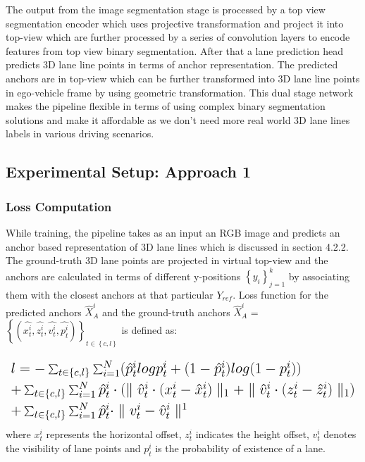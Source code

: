          The output from the image segmentation stage is processed by a top view segmentation encoder which uses projective transformation and project it into top-view which are further processed by a series of convolution layers to encode features from top view binary segmentation. After that a lane prediction head predicts 3D lane line points in terms of anchor representation. The predicted anchors are in top-view which can be further transformed into 3D lane line points in ego-vehicle frame by using geometric transformation. This dual stage network makes the pipeline flexible in terms of using complex binary segmentation solutions and make it affordable as we don't need more real world 3D lane lines labels in various driving scenarios.
        
        
        \subsection{Experimental Setup: Approach 1}
        
        
            \subsubsection{Loss Computation}
            While training, the pipeline takes as an input an RGB image and predicts an anchor based representation of 3D lane lines which is discussed in section 4.2.2. The ground-truth 3D lane points are projected in virtual top-view and the anchors are calculated in terms of different y-positions $\left\{ y_{i} \right\}^{k}_{j=1}$ by associating them with the closest anchors at that particular $Y_{ref}$. Loss function for the predicted anchors $\hat{X}_{A}^{i}$ and the ground-truth anchors $\hat{X}_{A}^{i}$ =$ \left\{(\hat{x^{i}_{t}},\hat{z^{i}_{t}},\hat{v^{i}_{t}},\hat{p^{i}_{t}})\right\}_{t\in\left\{c,l\right\}}     $ is defined as: 
            
            \begin{equation}%
\mbox{\fontsize{15}{21.6}\selectfont\( %
 \begin{array}{l}
                l = - \sum_{t\in\left\{c,l\right\}} \sum ^{N}_{i=1}(\hat{p}^{i}_{t} logp^{i}_{t} + (1-\hat{p}^{i}_{t})log(1-p^{i}_{t}) )   \\ 
                +  \sum_{t\in\left\{c,l\right\}} \sum ^{N}_{i=1}\hat{p}^{i}_{t}\cdot(\parallel \hat{v}^{i}_{t} \cdot (x^{i}_{t} - \hat{x}^{i}_{t}) \parallel_{1} + \parallel \hat{v}^{i}_{t} \cdot (z^{i}_{t} - \hat{z}^{i}_{t}) \parallel_{1} ) \\ 
                + \sum_{t\in\left\{c,l\right\}} \sum ^{N}_{i=1} \hat{p}^{i}_{t} \cdot \parallel v^{i}_{t} - \hat{v}^{i}_{t} \parallel^{1}
            \end{array} %
\)} %
\end{equation}
            where $x^{i}_{t}$ represents the horizontal offset, $z^{i}_{t}$ indicates the height offset, $v^{i}_{t}$ denotes the visibility of lane points and $p^{i}_{t}$ is the probability of existence of a lane. 
        
